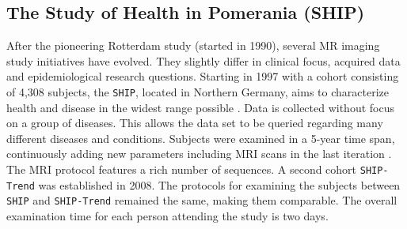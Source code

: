 \documentclass[journal]{style/vgtc} 			          %
\begin{document}


\subsection{The Study of Health in Pomerania (SHIP)}
After the pioneering Rotterdam study (started in 1990), several MR imaging study initiatives have evolved.
%
They slightly differ in clinical focus, acquired data and epidemiological research questions.
%
Starting in 1997 with a cohort consisting of 4,308 subjects, the \texttt{SHIP}, located in Northern Germany, aims to characterize health and disease in the widest range possible \cite{Volzke2011}.
%
Data is collected without focus on a group of diseases.
%
This allows the data set to be queried regarding many different diseases and conditions.
%
Subjects were examined in a 5-year time span, continuously adding new parameters including MRI scans in the last iteration \cite{Hegenscheid2009}.
%
The MRI protocol features a rich number of sequences.
%
%
A second cohort \texttt{SHIP-Trend} was established in 2008.
%
The protocols for examining the subjects between \texttt{SHIP} and \texttt{SHIP-Trend} remained the same, making them comparable.
%
The overall examination time for each person attending the study is two days.
\end{document}
